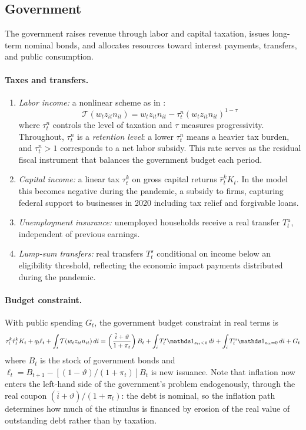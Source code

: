 \subsection{Government}

The government raises revenue through labor and capital taxation, issues
long-term nominal bonds, and allocates resources toward interest payments,
transfers, and public consumption.

\paragraph{Taxes and transfers.}
\begin{enumerate}
    \item \textit{Labor income:} a nonlinear scheme as in
    \textcite{Heathcote-Storesletten-Violante-2017}:
    \begin{equation} \label{tax_system}
        \mathcal{T}(w_{t} z_{it} n_{it}) = w_t z_{it} n_{it} - \tau_t^n (w_t z_{it} n_{it})^{1-\tau}
    \end{equation}
    where $\tau^n_t$ controls the level of taxation and $\tau$ measures
    progressivity. Throughout, $\tau^n_t$ is a \emph{retention level}: a lower
    $\tau^n_t$ means a heavier tax burden, and $\tau^n_t>1$ corresponds to a net
    labor subsidy. This rate serves as the residual fiscal instrument that
    balances the government budget each period.
    \item \textit{Capital income:} a linear tax $\tau^k_t$ on gross capital
    returns $\hat r^k_t K_t$. In the model this becomes negative during the
    pandemic, a subsidy to firms, capturing federal support to businesses in
    2020 including tax relief and forgivable loans.
    \item \textit{Unemployment insurance:} unemployed households receive a real
    transfer $T^u_t$, independent of previous earnings.
    \item \textit{Lump-sum transfers:} real transfers $T^s_t$ conditional on
    income below an eligibility threshold, reflecting the economic impact
    payments distributed during the pandemic.
\end{enumerate}

\paragraph{Budget constraint.} With public spending $G_t$, the government
budget constraint in real terms is
\begin{equation}\label{government_budget_constraint}
    \tau_t^k \hat{r}_t^k K_t + q_t \ell_t + \int_i\mathcal{T}(w_{t} z_{it} n_{it})\, di = \left(\frac{\bar{i} + \vartheta}{1+\pi_t}\right) B_t + \int_i T_{t}^s \Ind_{z_{it}<\bar z}\, di + \int_iT_{t}^u \Ind_{z_{it}=0}\, di + G_t
\end{equation}
where $B_t$ is the stock of government bonds and
$\ell_t = B_{t+1}-[(1-\vartheta)/(1+\pi_t)]B_t$ is new issuance. Note that
inflation now enters the left-hand side of the government's problem
endogenously, through the real coupon
$(\bar i+\vartheta)/(1+\pi_t)$: the debt is nominal, so the inflation path
determines how much of the stimulus is financed by erosion of the real value of
outstanding debt rather than by taxation.

